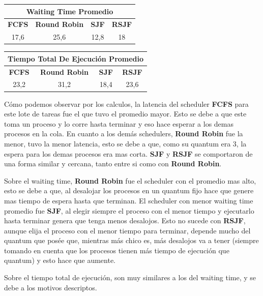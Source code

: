 \begin{center}
	\begin{tabular}{|c|c|c|c|}
		\hline
		\multicolumn{4}{|c|}{\large{\textbf{Waiting Time Promedio}}} \\
		\hline
		\textbf{FCFS} & \textbf{Round Robin} & \textbf{SJF} & \textbf{RSJF} \\
		\hline
		17,6 & 25,6 & 12,8 & 18 \\
		\hline
	\end{tabular}
\end{center}

\begin{center}
	\begin{tabular}{|c|c|c|c|}
		\hline
		\multicolumn{4}{|c|}{\large{\textbf{Tiempo Total De Ejecución Promedio}}} \\
		\hline
		\textbf{FCFS} & \textbf{Round Robin} & \textbf{SJF} & \textbf{RSJF} \\
		\hline
		23,2 & 31,2 & 18,4 & 23,6 \\
		\hline
	\end{tabular}
\end{center}

Cómo podemos observar por los calculos, la latencia del scheduler \textbf{FCFS} para este lote de tareas fue el que tuvo el promedio mayor. Esto se debe a que este toma un proceso y lo corre hasta terminar y eso hace esperar a los demas procesos en la cola. En cuanto a los demás schedulers, \textbf{Round Robin} fue la menor, tuvo la menor latencia, esto se debe a que, como su quantum era 3, la espera para los demas procesos era mas corta. \textbf{SJF} y \textbf{RSJF} se comportaron de una forma similar y cercana, tanto entre si como con \textbf{Round Robin}.

Sobre el waiting time, \textbf{Round Robin} fue el scheduler con el promedio mas alto, esto se debe a que, al desalojar los procesos en un quantum fijo hace que genere mas tiempo de espera hasta que terminan. El scheduler con menor waiting time promedio fue \textbf{SJF}, al elegir siempre el proceso con el menor tiempo y ejecutarlo hasta terminar genera que tenga menos desalojos. Esto no sucede con \textbf{RSJF}, aunque elija el proceso con el menor tiempo para terminar, depende mucho del quantum que posée que, mientras más chico es, más desalojos va a tener (siempre tomando en cuenta que los procesos tienen más tiempo de ejecución que quantum) y esto hace que aumente.

Sobre el tiempo total de ejecución, son muy similares a los del waiting time, y se debe a los motivos descriptos.

